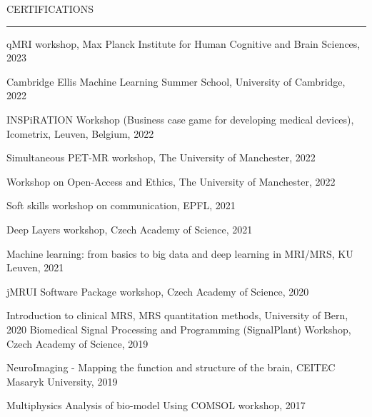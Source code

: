 \documentclass{resume} %
\renewenvironment{rSection}[1]{
\sectionskip
\textcolor{RoyalPurple}{\MakeUppercase{#1}}
\sectionlineskip
\hrule
\begin{list}{}{
\setlength{\leftmargin}{1.5em}
}
\item[]
}{
\end{list}
}
\begin{document}

\begin{rSection}{ CERTIFICATIONS} \itemsep -2pt
\begin{rSubsection}{}{}{}{}
\item {qMRI workshop, Max Planck Institute for Human Cognitive and Brain Sciences, 2023}
\item {Cambridge Ellis Machine Learning Summer School, University of Cambridge, 2022}
\item {INSPiRATION Workshop (Business case game for developing medical devices), Icometrix, Leuven, Belgium, 2022}

\item {Simultaneous PET-MR workshop,  The University of Manchester, 2022}
\item {Workshop on Open-Access and Ethics,  The University of Manchester, 2022}
\item {Soft skills workshop on communication, EPFL, 2021}

\item {Deep Layers workshop, Czech Academy of Science, 2021}
\item {Machine learning: from basics to big data and deep learning in MRI/MRS, KU Leuven, 2021}
\item {jMRUI Software Package workshop, Czech Academy of Science, 2020}

\item {Introduction to clinical MRS, MRS quantitation methods, University of Bern, 2020}
 {Biomedical Signal Processing and Programming (SignalPlant) Workshop, Czech Academy of Science, 2019}
\item {NeuroImaging - Mapping the function and structure of the brain, CEITEC Masaryk University, 2019}
\item {Multiphysics Analysis of bio-model Using COMSOL workshop, 2017}
\end{rSubsection}
\end{rSection}

\end{document}
